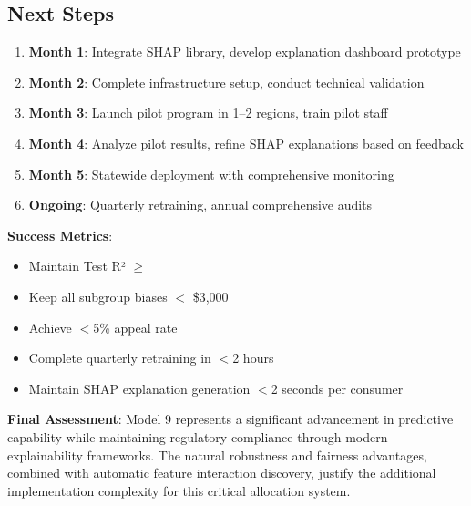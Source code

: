 \subsection{Next Steps}

\begin{enumerate}
    \item \textbf{Month 1}: Integrate SHAP library, develop explanation dashboard prototype
    \item \textbf{Month 2}: Complete infrastructure setup, conduct technical validation
    \item \textbf{Month 3}: Launch pilot program in 1--2 regions, train pilot staff
    \item \textbf{Month 4}: Analyze pilot results, refine SHAP explanations based on feedback
    \item \textbf{Month 5}: Statewide deployment with comprehensive monitoring
    \item \textbf{Ongoing}: Quarterly retraining, annual comprehensive audits
\end{enumerate}

\textbf{Success Metrics}:
\begin{itemize}
    \item Maintain Test R² $\geq$ \ModelNineRSquaredTest{}
    \item Keep all subgroup biases $<$ \$3,000
    \item Achieve $<$5\% appeal rate
    \item Complete quarterly retraining in $<$2 hours
    \item Maintain SHAP explanation generation $<$2 seconds per consumer
\end{itemize}

\textbf{Final Assessment}: Model 9 represents a significant advancement in predictive capability while maintaining regulatory compliance through modern explainability frameworks. The natural robustness and fairness advantages, combined with automatic feature interaction discovery, justify the additional implementation complexity for this critical allocation system.